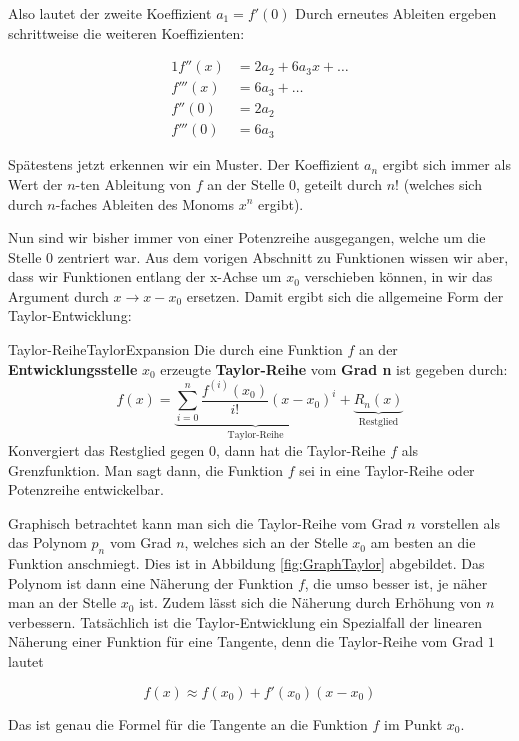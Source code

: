Also lautet der zweite Koeffizient $a_1 = f'(0)$ Durch erneutes Ableiten ergeben schrittweise die weiteren Koeffizienten:

\begin{alignat*}{1}
    f''(x)  &= 2 a_2 + 6 a_3 x + \dots \\
    f'''(x) &= 6 a_3 + \dots \\
    f''(0)  &= 2 a_2 \\
    f'''(0) &= 6 a_3
\end{alignat*}

Spätestens jetzt erkennen wir ein Muster. Der Koeffizient $a_n$ ergibt sich immer als Wert der $n$-ten Ableitung von $f$ an der Stelle $0$, geteilt durch $n!$ (welches sich durch $n$-faches Ableiten des Monoms $x^n$ ergibt).

Nun sind wir bisher immer von einer Potenzreihe ausgegangen, welche um die Stelle $0$ zentriert war. Aus dem vorigen Abschnitt zu Funktionen wissen wir aber, dass wir Funktionen entlang der x-Achse um $x_0$ verschieben können, in wir das Argument durch $x \to x-x_0$ ersetzen. Damit ergibt sich die allgemeine Form der Taylor-Entwicklung:

\begin{definition}{Taylor-Reihe}{TaylorExpansion}
    Die durch eine Funktion $f$ an der \textbf{Entwicklungsstelle} $x_0$ erzeugte \textbf{Taylor-Reihe} vom \textbf{Grad n} ist gegeben durch:
    $$
        f(x) = \underbrace{\sum\limits_{i=0}^n \frac{f^{(i)}(x_0)}{i!} (x-x_0)^i}_{\text{Taylor-Reihe}} + \underbrace{R_n(x)}_{\text{Restglied}}
    $$
    Konvergiert das Restglied gegen $0$, dann hat die Taylor-Reihe $f$ als Grenzfunktion. Man sagt dann, die Funktion $f$ sei in eine Taylor-Reihe oder Potenzreihe entwickelbar.
\end{definition}

Graphisch betrachtet kann man sich die Taylor-Reihe vom Grad $n$ vorstellen als das Polynom $p_n$ vom Grad $n$, welches sich an der Stelle $x_0$ am besten an die Funktion anschmiegt. Dies ist in Abbildung \ref{fig:GraphTaylor} abgebildet. Das Polynom ist dann eine Näherung der Funktion $f$, die umso besser ist, je näher man an der Stelle $x_0$ ist. Zudem lässt sich die Näherung durch Erhöhung von $n$ verbessern. Tatsächlich ist die Taylor-Entwicklung ein Spezialfall der linearen Näherung einer Funktion für eine Tangente, denn die Taylor-Reihe vom Grad $1$ lautet

$$
    f(x) \approx f(x_0) + f'(x_0) (x-x_0)
$$

Das ist genau die Formel für die Tangente an die Funktion $f$ im Punkt $x_0$.

